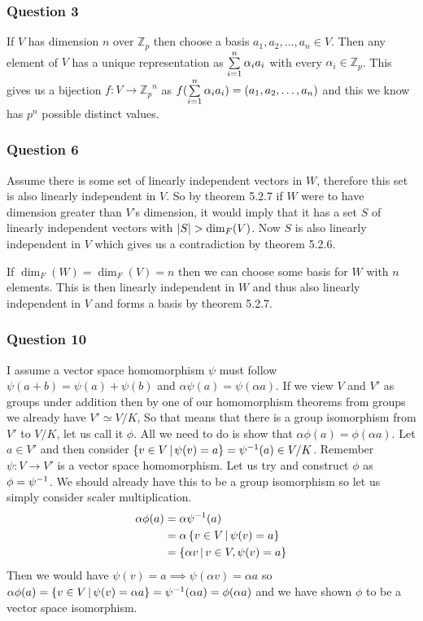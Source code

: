 \documentclass{article}
\begin{document}
\subsubsection{Question 3}
If $V$ has dimension $n$ over $\mathbb Z_p$ then choose a basis $a_1, a_2, \ldots, a_n\in V$. Then any element of $V$ has a unique representation as $\sum\limits_{i=1}^{n}  {\alpha_ia_i} $ with every $\alpha_i\in\mathbb Z_p$. This gives us a bijection $f:V\to{\mathbb Z_p}^n$ as $f(\sum\limits_{i=1}^{n}  {\alpha_ia_i} ) = (a_1, a_2, \ldots, a_n)$ and this we know has $p^n$ possible distinct values.

\subsubsection{Question 6}

Assume there is some set of linearly independent vectors in $W$, therefore this set is also linearly independent in $V$. So by theorem 5.2.7 if $W$ were to have dimension greater than $V$'s dimension, it would imply that it has a set $S$ of linearly independent vectors with $\left| {S} \right| > \dim_F(V)$. Now $S$ is also linearly independent in $V$ which gives us a contradiction by theorem 5.2.6.

If $\dim_F(W) = \dim_F(V) = n$ then we can choose some basis for $W$ with $n$ elements. This is then linearly independent in $W$ and thus also linearly independent in $V$ and forms a basis by theorem 5.2.7.

\subsubsection{Question 10}
I assume a vector space homomorphism $\psi$ must follow $\psi(a+b) = \psi(a)+\psi(b)$ and $\alpha\psi(a) = \psi(\alpha a)$. If we view $V$ and $V'$ as groups under addition then by one of our homomorphism theorems from groups we already have $V'\simeq V/K$, So that means that there is a group isomorphism from $V'$ to $V/K$, let us call it $\phi$. All we need to do is show that $\alpha \phi(a) = \phi(\alpha a)$. Let $a \in V'$ and then consider $\left\{{v\in V} \,\middle|\, {\psi(v) = a}\right\} = {\psi}^{-1}(a) \in V/K$. Remember $\psi:V\to V'$ is a vector space homomorphism. Let us try and construct $\phi$ as $\phi = {\psi}^{-1}$. We should already have this to be a group isomorphism so let us simply consider scaler multiplication.
\begin{align*}
\alpha\phi(a) &= \alpha{\psi}^{-1}(a)\\
& = \alpha\left\{{v \in V} \,\middle|\, {\psi(v) = a}\right\}\\ &= \left\{{\alpha v} \,\middle|\, {v\in V, \psi(v) = a}\right\}
\end{align*} Then we would have $\psi(v) = a \implies \psi(\alpha v) = \alpha a$ so $\alpha\phi(a) = \left\{{v\in V} \,\middle|\, {\psi(v) = \alpha a}\right\} = {\psi}^{-1}(\alpha a)= \phi(\alpha a)$ and we have shown $\phi$ to be a vector space isomorphism.
\end{document}
